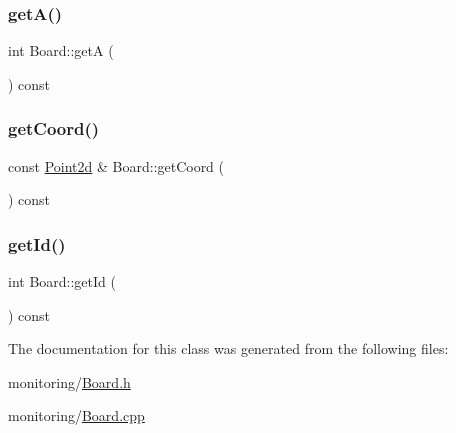 \mbox{\label{class_board_a041a59160ae5d73e8eb0fc73cc71dc7f}} 
\subsubsection{\texorpdfstring{get\+A()}{getA()}}
{\footnotesize\ttfamily int Board\+::getA (\begin{DoxyParamCaption}{ }\end{DoxyParamCaption}) const}

\mbox{\label{class_board_a3b0c3eb250898188bf2b6d591f57ec55}} 
\subsubsection{\texorpdfstring{get\+Coord()}{getCoord()}}
{\footnotesize\ttfamily const \hyperlink{class_point2d}{Point2d} \& Board\+::get\+Coord (\begin{DoxyParamCaption}{ }\end{DoxyParamCaption}) const}

\mbox{\label{class_board_ad46291901cf39cefa566df88e035698d}} 
\subsubsection{\texorpdfstring{get\+Id()}{getId()}}
{\footnotesize\ttfamily int Board\+::get\+Id (\begin{DoxyParamCaption}{ }\end{DoxyParamCaption}) const}



The documentation for this class was generated from the following files\+:\begin{DoxyCompactItemize}
\item 
monitoring/\hyperlink{_board_8h}{Board.\+h}\item 
monitoring/\hyperlink{_board_8cpp}{Board.\+cpp}\end{DoxyCompactItemize}
